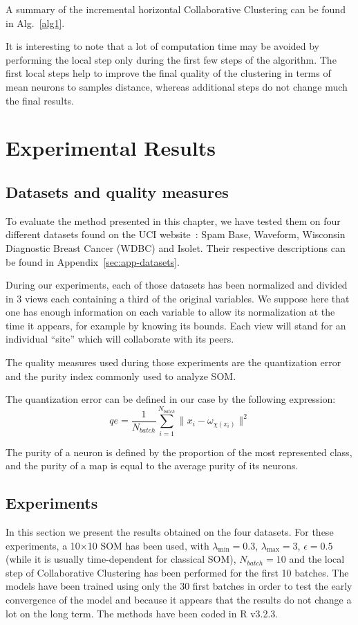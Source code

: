 	A summary of the incremental horizontal Collaborative Clustering can be found in Alg.~\ref{alg1}.
	
	It is interesting to note that a lot of computation time may be avoided by performing the local step only during the first few steps of the algorithm. The first local steps help to improve the final quality of the clustering in terms of mean neurons to samples distance, whereas additional steps do not change much the final results.
	
	\section{Experimental Results}
\label{experiments}
	
	\subsection{Datasets and quality measures}
    To evaluate the method presented in this chapter, we have tested them on four different datasets found on the UCI website~\cite{uci}: Spam Base, Waveform, Wisconsin Diagnostic Breast Cancer (WDBC) and Isolet. Their respective descriptions can be found in Appendix~\ref{sec:app-datasets}.

	During our experiments, each of those datasets has been normalized and divided in 3 views each containing a third of the original variables. We suppose here that one has enough information on each variable to allow its normalization at the time it appears, for example by knowing its bounds. Each view will stand for an individual ``site'' which will collaborate with its peers.
	
	The quality measures used during those experiments are the quantization error and the purity index commonly used to analyze SOM.\@
	
	The quantization error can be defined in our case by the following expression:
	\begin{equation}
	qe = \frac{1}{N_{batch}}\sum_{i=1}^{N_{batch}}\|x_i - \omega_{\chi(x_i)}\|^2
	\end{equation}
	
	The purity of a neuron is defined by the proportion of the most represented class, and the purity of a map is equal to the average purity of its neurons. 
		
	\subsection{Experiments}
	In this section we present the results obtained on the four datasets. For these experiments, a 10$\times$10 SOM has been used, with $\lambda_{\min}=0.3$, $\lambda_{\max}=3$, $\epsilon=0.5$ (while it is usually time-dependent for classical SOM), $N_{batch}=10$ and the local step of Collaborative Clustering has been performed for the first 10 batches. The models have been trained using only the 30 first batches in order to test the early convergence of the model and because it appears that the results do not change a lot on the long term. The methods have been coded in R v3.2.3.
	
